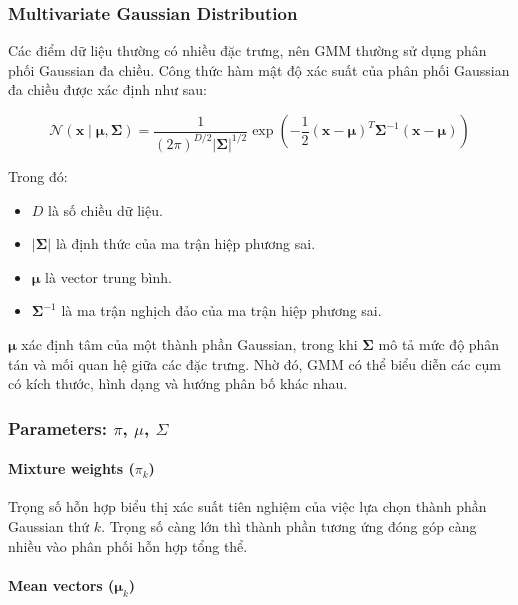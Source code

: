 \documentclass[12pt,a4paper]{article}
\begin{document}
\subsubsection*{Multivariate Gaussian Distribution}

Các điểm dữ liệu thường có nhiều đặc trưng, nên GMM
thường sử dụng phân phối Gaussian đa chiều. Công thức
hàm mật độ xác suất của phân phối Gaussian đa chiều được
xác định như sau:

\begin{equation}
\mathcal{N}(\bm{x}\mid\bm{\mu},\boldsymbol{\Sigma})
=
\frac{1}
{(2\pi)^{D/2}|\boldsymbol{\Sigma}|^{1/2}}
\exp\left(
-\frac{1}{2}
(\bm{x}-\bm{\mu})^{T}
\boldsymbol{\Sigma}^{-1}
(\bm{x}-\bm{\mu})
\right)
\end{equation}

Trong đó:
\begin{itemize}[leftmargin=1.5cm]
    \item $D$ là số chiều dữ liệu.
    \item $|\boldsymbol{\Sigma}|$ là định thức của ma trận
    hiệp phương sai.
    \item $\bm{\mu}$ là vector trung bình.
    \item $\boldsymbol{\Sigma}^{-1}$ là ma trận nghịch đảo
    của ma trận hiệp phương sai.
\end{itemize}

$\bm{\mu}$ xác định tâm của một thành phần Gaussian,
trong khi $\boldsymbol{\Sigma}$ mô tả mức độ phân tán
và mối quan hệ giữa các đặc trưng. Nhờ đó, GMM có thể
biểu diễn các cụm có kích thước, hình dạng và hướng
phân bố khác nhau.

\subsubsection*{Parameters: $\pi$, $\mu$, $\Sigma$}

\paragraph{Mixture weights ($\pi_k$)}

Trọng số hỗn hợp biểu thị xác suất tiên nghiệm của việc
lựa chọn thành phần Gaussian thứ $k$. Trọng số càng lớn
thì thành phần tương ứng đóng góp càng nhiều vào phân phối
hỗn hợp tổng thể.

\paragraph{Mean vectors ($\bm{\mu}_k$)}
\end{document}
